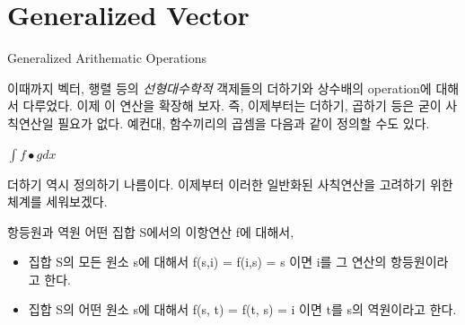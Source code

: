 \documentclass{beamer}
\begin{document}








\section{Generalized Vector}


\begin{frame}{Generalized Arithematic Operations} 

이때까지 벡터, 행렬 등의 \textit{선형대수학적} 객제들의 더하기와 상수배의 operation에 대해서 다루었다. 이제 이 연산을 확장해 보자. 즉, 이제부터는 더하기, 곱하기 등은 굳이 사칙연산일 필요가 없다. 예컨대, 함수끼리의 곱셈을 다음과 같이 정의할 수도 있다. 

$\int f \bullet g dx $ 

더하기 역시 정의하기 나름이다. 이제부터 이러한 일반화된 사칙연산을 고려하기 위한 체계를 세워보겠다. 

\end{frame}






\begin{frame}{항등원과 역원} 
어떤 집합 S에서의 이항연산 f에 대해서, 

\begin{itemize} 
\item 집합 S의 모든 원소 s에 대해서 f(s,i) = f(i,s) = s 이면 i를 그 연산의 항등원이라고 한다. 
\item 집합 S의 어떤 원소 s에 대해서 f(s, t) = f(t, s) = i 이면 t를 s의 역원이라고 한다. 
\end{itemize}
\end{frame}
\end{document}
